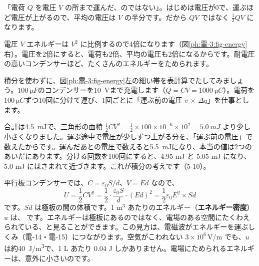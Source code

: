 \begin{phyomi}[$U=\tfrac12QV$]
「電荷 $Q$ を電圧 $V$ の所まで運んだ、のではない」。はじめは電圧が0で、運ぶほど電圧が上がるので、平均の電圧は $V$ の半分です。だから $QV$ ではなく $\tfrac12QV$ になります。
\end{phyomi}

\begin{phbaisuru}{電圧 $V$}
エネルギーは $V^2$ に比例するので4倍になります（図\ref{ph:電-3:fig-energy}右）。電圧を2倍にすると、電荷も2倍、平均の電圧も2倍になるからです。耐電圧の高いコンデンサーほど、たくさんのエネルギーをためられます。
\end{phbaisuru}

積分を使わずに、図\ref{ph:電-3:fig-energy}左の細い帯を表計算でたしてみましょう。$\qty{100}{\micro F}$のコンデンサーを\qty{10}{V}まで充電します（$Q=CV=\qty{1000}{\micro C}$）。電荷を$\qty{100}{\micro C}$ずつ10回に分けて運び、1回ごとに「運ぶ前の電圧 $v$ × $\Delta q$」を仕事とします。
\begin{bkcenter}
\label{ph:電-3:tab-sheet}
\end{bkcenter}
合計は\qty{4.5}{mJ}で、三角形の面積 $\tfrac12CV^2=\tfrac12\times100\times10^{-6}\times10^2=\qty{5.0}{mJ}$ より少し小さくなりました。運ぶ途中で電圧が少しずつ上がる分を、「運ぶ前の電圧」で数えたからです。運んだあとの電圧で数えると\qty{5.5}{mJ}になり、本当の値は2つのあいだにあります。分ける回数を100回にすると、4.95 mJ と 5.05 mJ になり、5.0 mJ にはさまれて近づきます。これが積分の考えです（5-10）。

平行板コンデンサーでは、$C=\varepsilon_0S/d$、$V=Ed$ なので、
\[U=\frac12CV^2=\frac12\cdot\frac{\varepsilon_0S}{d}\cdot(Ed)^2=\frac12\varepsilon_0E^2\times Sd\]
です。$Sd$ は極板の間の体積です。1 m$^3$ あたりのエネルギー（\textbf{エネルギー密度}）$u$ は、
\label{ph:電-3:mitsudo}です。エネルギーは極板にあるのではなく、電場のある空間にたくわえられている、と見ることができます。この見方は、電磁波がエネルギーを運ぶしくみ（電-14・電-15）につながります。空気がこわれない $3\times10^6$\,V/m でも、$u$ は約\qty{40}{J/m^3}で、1 L あたり 0.04 J しかありません。電場にためられるエネルギーは、意外に小さいのです。

